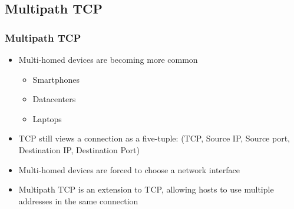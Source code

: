 \documentclass{beamer}
\begin{document}
\subsection{Multipath TCP}

\begin{frame}
  \frametitle{Multipath TCP}

  \begin{itemize}
  \item Multi-homed devices are becoming more common
    \begin{itemize}
    \item Smartphones
    \item Datacenters
    \item Laptops
    \end{itemize}
  \item TCP still views a connection as a five-tuple: (TCP, Source IP, Source
    port, Destination IP, Destination Port)
  \item Multi-homed devices are forced to choose a network interface
  \item Multipath TCP is an extension to TCP, allowing hosts to use multiple
    addresses in the same connection
  \end{itemize}
\end{frame}
\end{document}

